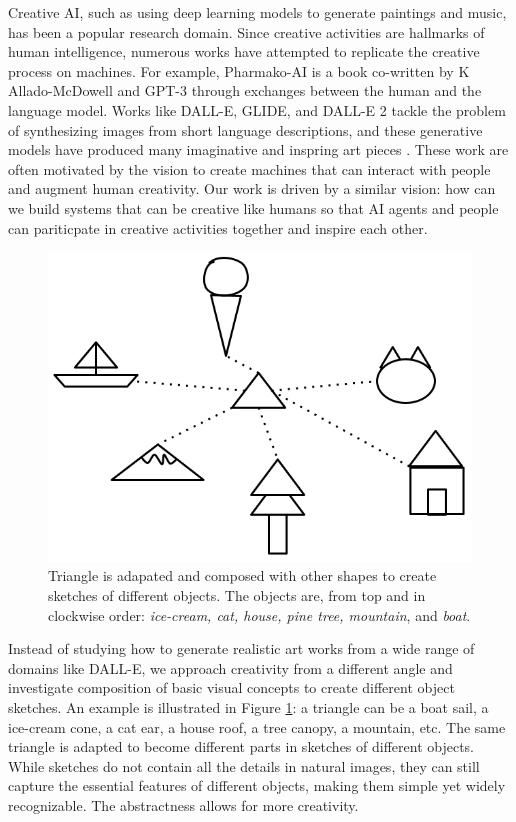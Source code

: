 Creative AI, such as using deep learning models to generate paintings and music, has been a popular research domain.
Since creative activities are hallmarks of human intelligence, numerous works have attempted to replicate the creative process on machines.
For example, Pharmako-AI \citep{allado-mcdowell_okojie_2020} is a book co-written by K Allado-McDowell and GPT-3 \citep{gpt3} through exchanges between the human and the language model. 
Works like DALL-E, GLIDE, and DALL-E 2 tackle the problem of synthesizing images from short language descriptions, and these generative models have produced many imaginative and inspring art pieces \citep{dallePaper,glidePaper,dalle2Paper}.
These work are often motivated by the vision to create machines that can interact with people and augment human creativity.  
Our work is driven by a similar vision: how can we build systems that can be creative like humans so that AI agents and people can pariticpate in creative activities together and inspire each other. 

\begin{figure}[!htb]
\centering
\includegraphics[width=.3\linewidth]{introduction/sketch_composition.png}  
\caption{Triangle is adapated and composed with other shapes to create sketches of different objects. The objects are, from top and in clockwise order: \textit{ice-cream, cat, house, pine tree, mountain}, and \textit{boat}.}
\label{introduction.composition}
\end{figure}

Instead of studying how to generate realistic art works from a wide range of domains like DALL-E, we approach creativity from a different angle and investigate composition of basic visual concepts to create different object sketches.
An example is illustrated in Figure \ref{introduction.composition}: a triangle can be a boat sail, a ice-cream cone, a cat ear, a house roof, a tree canopy, a mountain, etc. The same triangle is adapted to become different parts in sketches of different objects. 
While sketches do not contain all the details in natural images, they can still capture the essential features of different objects, making them simple yet widely recognizable. The abstractness allows for more creativity. 


